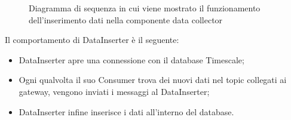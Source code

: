 \begin{landscape}
\begin{figure}[H]
				\caption{Diagramma di sequenza in cui viene mostrato il funzionamento dell'inserimento dati nella componente data collector}
				\label{Diagramma 8}
			\end{figure}
			Il comportamento di DataInserter è il seguente:
			\begin{itemize}
				\item DataInserter apre una connessione con il database Timescale;
				\item Ogni qualvolta il suo Consumer trova dei nuovi dati nel topic collegati ai gateway, vengono inviati i messaggi al DataInserter;
				\item DataInserter infine inserisce i dati all'interno del database.
			\end{itemize}
	\end{landscape}